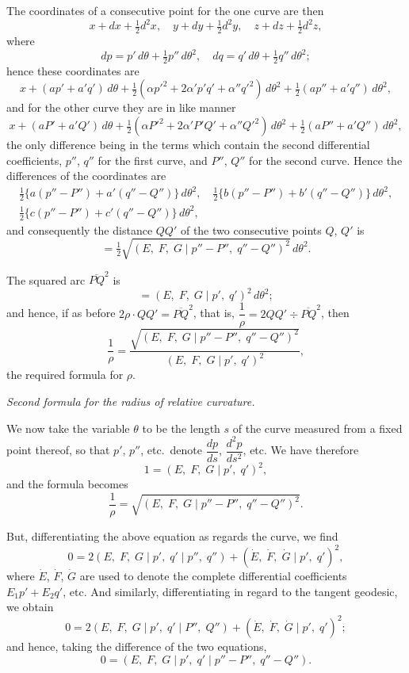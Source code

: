 \documentclass[11pt,a4paper]{book}
\begin{document}
The coordinates of a consecutive point for the one curve are then
\[
x + dx + \tfrac{1}{2}d^2x,\quad y + dy + \tfrac{1}{2}d^2y,\quad z + dz + \tfrac{1}{2}d^2z,
\]
where
\[
dp = p'\,d\theta + \tfrac{1}{2}p''\,d\theta^2,\quad dq = q'\,d\theta + \tfrac{1}{2}q''\,d\theta^2;
\]
hence these coordinates are
\[
x + (ap' + a'q')\,d\theta + \tfrac{1}{2}(\alpha p'^2 + 2\alpha'p'q' + \alpha''q'^2)\,d\theta^2 + \tfrac{1}{2}(ap'' + a'q'')\,d\theta^2,
\]
and for the other curve they are in like manner
\[
x + (aP' + a'Q')\,d\theta + \tfrac{1}{2}(\alpha P'^2 + 2\alpha'P'Q' + \alpha''Q'^2)\,d\theta^2 + \tfrac{1}{2}(aP'' + a'Q'')\,d\theta^2,
\]
the only difference being in the terms which contain the second differential coefficients, $p''$, $q''$ for the first curve, and $P''$, $Q''$ for the second curve. Hence the differences of the coordinates are
\begin{gather*}
\tfrac{1}{2}\{a(p'' - P'') + a'(q'' - Q'')\}\,d\theta^2,\quad
\tfrac{1}{2}\{b(p'' - P'') + b'(q'' - Q'')\}\,d\theta^2, \\
\tfrac{1}{2}\{c(p'' - P'') + c'(q'' - Q'')\}\,d\theta^2,
\end{gather*}
and consequently the distance $QQ'$ of the two consecutive points $Q$, $Q'$ is
\[
= \tfrac{1}{2}\sqrt{(E,\; F,\; G \mid p'' - P'',\; q'' - Q'')^2}\,d\theta^2.
\]

The squared arc $\overline{PQ}^2$ is
\[
= (E,\; F,\; G \mid p',\; q')^2\,d\theta^2;
\]
and hence, if as before $2\rho \cdotp QQ' = \overline{PQ}^2$, that is, $\dfrac{1}{\rho} = 2QQ' \div \overline{PQ}^2$, then
\[
\frac{1}{\rho} = \frac{\sqrt{(E,\; F,\; G \mid p'' - P'',\; q'' - Q'')^2}}{(E,\; F,\; G \mid p',\; q')^2},
\]
the required formula for $\rho$.

\begin{center}
\textit{Second formula for the radius of relative curvature.}
\end{center}

We now take the variable $\theta$ to be the length $s$ of the curve measured from a fixed point thereof, so that $p'$, $p''$, etc.\ denote $\dfrac{dp}{ds}$, $\dfrac{d^2p}{ds^2}$, etc. We have therefore
\[
1 = (E,\; F,\; G \mid p',\; q')^2,
\]
and the formula becomes
\[
\frac{1}{\rho} = \sqrt{(E,\; F,\; G \mid p'' - P'',\; q'' - Q'')^2}.
\]

But, differentiating the above equation as regards the curve, we find
\[
0 = 2(E,\; F,\; G \mid p',\; q' \mid p'',\; q'') + (\dot{E},\; \dot{F},\; \dot{G} \mid p',\; q')^2,
\]
where $\dot{E}$, $\dot{F}$, $\dot{G}$ are used to denote the complete differential coefficients $E_1 p' + E_2 q'$, etc. And similarly, differentiating in regard to the tangent geodesic, we obtain
\[
0 = 2(E,\; F,\; G \mid p',\; q' \mid P'',\; Q'') + (\dot{E},\; \dot{F},\; \dot{G} \mid p',\; q')^2;
\]
and hence, taking the difference of the two equations,
\[
0 = (E,\; F,\; G \mid p',\; q' \mid p'' - P'',\; q'' - Q'').
\]
\end{document}
